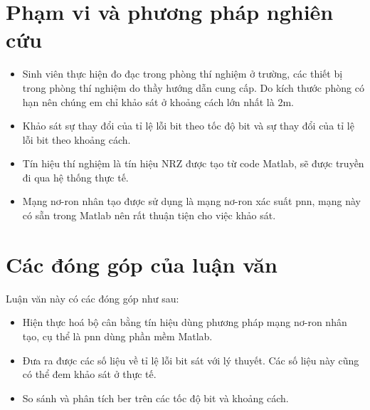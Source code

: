 \section{Phạm vi và phương pháp nghiên cứu}


\begin{itemize}
	\item  Sinh viên thực hiện đo đạc trong phòng thí nghiệm ở trường, các thiết bị trong phòng thí nghiệm do thầy hướng dẫn cung cấp. Do kích thước phòng có hạn nên chúng em chỉ khảo sát ở khoảng cách lớn nhất là 2m.
	\item  Khảo sát sự thay đổi của tỉ lệ lỗi bit theo tốc độ bit và sự thay đổi của tỉ lệ lỗi bit theo khoảng cách. 
	\item Tín hiệu thí nghiệm là tín hiệu NRZ được tạo từ code Matlab, sẽ được truyền đi qua hệ thống thực tế.  
	\item Mạng nơ-ron nhân tạo được sử dụng là mạng nơ-ron xác suất \ac{pnn}, mạng này có sẵn trong Matlab nên rất thuận tiện cho việc khảo sát.
	
\end{itemize}
	
	
	
	
\section{Các đóng góp của luận văn}
	
Luận văn này có các đóng góp như sau:

\begin{itemize}
	\item Hiện thực hoá bộ cân bằng tín hiệu dùng phương pháp mạng nơ-ron nhân tạo, cụ thể là \ac{pnn} dùng phần mềm Matlab.
	\item Đưa ra được các số liệu về tỉ lệ lỗi bit sát với lý thuyết. Các số liệu này cũng có thể đem khảo sát ở thực tế.
	\item So sánh và phân tích \ac{ber} trên các tốc độ bit và khoảng cách.
\end{itemize}	